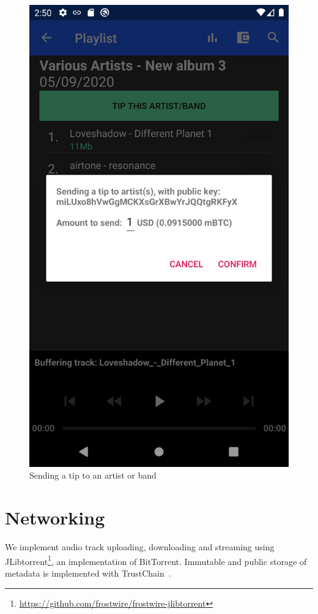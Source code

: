\begin{figure}
        \includegraphics[width=1\linewidth]{implementation/tip-artist.png}
        \caption{Sending a tip to an artist or band}
        \label{fig:tip-artist}
    \endminipage\hfill
\end{figure}

\section{Networking}
We implement audio track uploading, downloading and streaming using JLibtorrent\footnote{\url{https://github.com/frostwire/frostwire-jlibtorrent}}, an implementation of BitTorrent. Immutable and public storage of metadata is implemented with TrustChain~\citep{otte2017trustchain}. 
